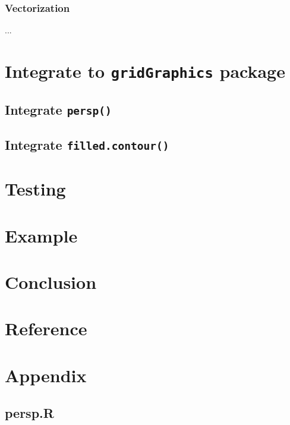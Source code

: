 \documentclass[paper=a4, fontsize=11pt]{report}
\begin{document}
\subsection{Vectorization}
...

\chapter{Integrate to \texttt{gridGraphics} package}
\section{Integrate \texttt{persp()}}
\section{Integrate \texttt{filled.contour()}}

\chapter{Testing}
\chapter{Example}
\chapter{Conclusion}
\chapter{Reference}
\chapter{Appendix}
\section{persp.R}
\end{document}
